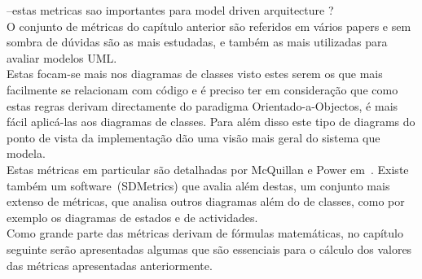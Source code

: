 --estas metricas sao importantes para model driven arquitecture ?\\

O conjunto de métricas do capítulo anterior são referidos em vários papers e sem sombra de dúvidas são as mais estudadas, e também as mais utilizadas para avaliar modelos UML.\\
Estas focam-se mais nos diagramas de classes visto estes serem os que mais facilmente se relacionam com código e é preciso ter em consideração que como estas regras derivam 
directamente do paradigma Orientado-a-Objectos, é mais fácil aplicá-las aos diagramas de classes. Para além disso este tipo de diagrams do ponto de vista da implementação 
dão uma visão mais geral do sistema que modela.\\

Estas métricas em particular são detalhadas por McQuillan e Power em~\cite{Power}. Existe também um software~\cite{SDMetrics}(SDMetrics) que avalia além destas, um conjunto
 mais extenso de métricas, que analisa outros diagramas além do de classes, como por exemplo os diagramas de estados e de actividades. \\ 
Como grande parte das métricas derivam de fórmulas matemáticas, no capítulo seguinte serão apresentadas algumas que são essenciais para o cálculo dos valores das métricas apresentadas 
anteriormente.

